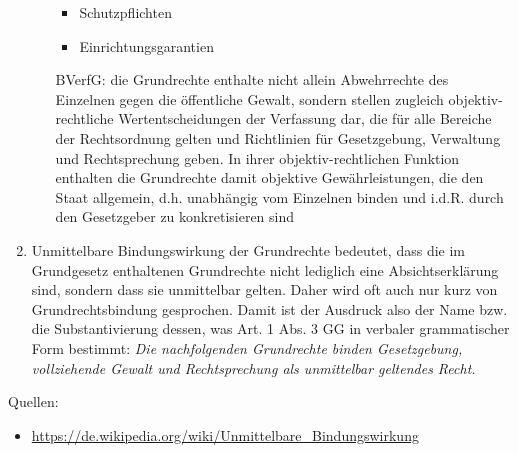 \documentclass{article}
\begin{document}
\begin{enumerate}[label=(\alph*)]
\begin{itemize}
\begin{itemize}
				\item Schutzpflichten
				\item Einrichtungsgarantien
			\end{itemize}
			BVerfG: die Grundrechte enthalte nicht allein Abwehrrechte des Einzelnen gegen die öffentliche Gewalt, sondern stellen zugleich objektiv-rechtliche Wertentscheidungen der Verfassung dar, die für alle Bereiche der Rechtsordnung gelten und Richtlinien für Gesetzgebung, Verwaltung und Rechtsprechung geben. In ihrer objektiv-rechtlichen Funktion enthalten die Grundrechte damit objektive Gewährleistungen, die den Staat allgemein, d.h. unabhängig vom Einzelnen binden und i.d.R. durch den Gesetzgeber zu konkretisieren sind
		\end{itemize}
		\item Unmittelbare Bindungswirkung der Grundrechte bedeutet, dass die im Grundgesetz enthaltenen Grundrechte nicht lediglich eine Absichtserklärung sind, sondern dass sie unmittelbar gelten. Daher wird oft auch nur kurz von Grundrechtsbindung gesprochen. Damit ist der Ausdruck also der Name bzw. die Substantivierung dessen, was Art. 1 Abs. 3 GG in verbaler grammatischer Form bestimmt: \textit{Die nachfolgenden Grundrechte binden Gesetzgebung, vollziehende Gewalt und Rechtsprechung als unmittelbar geltendes Recht.}
	\end{enumerate}

	Quellen:
	\begin{itemize}
		\item \url{https://de.wikipedia.org/wiki/Unmittelbare_Bindungswirkung}
	\end{itemize}
\end{document}
